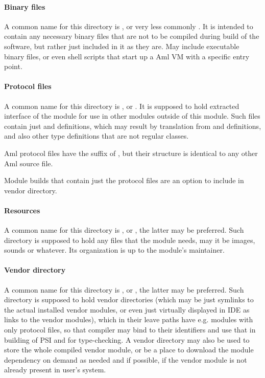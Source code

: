 \paragraph{Binary files}
A common name for this directory is , or very less commonly . It is intended to contain any necessary binary files that are not to be compiled during build of the software, but rather just included in it as they are. May include executable binary files, or even shell scripts that start up a Aml VM with a specific entry point. 

\paragraph{Protocol files}
A common name for this directory is , or . It is supposed to hold extracted interface of the module for use in other modules outside of this module. Such files contain just  and  definitions, which may result by translation from  and  definitions, and also other type definitions that are not regular classes. 

Aml protocol files have the suffix of , but their structure is identical to any other Aml source file. 

Module builds that contain just the protocol files are an option to include in vendor directory. 

\paragraph{Resources}
A common name for this directory is , or , the latter may be preferred. Such directory is supposed to hold any files that the module needs, may it be images, sounds or whatever. Its organization is up to the module's maintainer. 

\paragraph{Vendor directory}
A common name for this directory is , or , the latter may be preferred. Such directory is supposed to hold vendor directories (which may be just symlinks to the actual installed vendor modules, or even just virtually displayed in IDE as links to the vendor modules), which in their leave paths have e.g. modules with only protocol files, so that compiler may bind to their identifiers and use that in building of PSI and for type-checking. A vendor directory may also be used to store the whole compiled vendor module, or be a place to download the module dependency on demand as needed and if possible, if the vendor module is not already present in user's system. 

